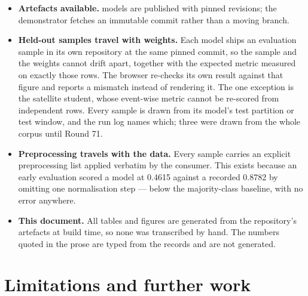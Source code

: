 \documentclass[11pt,a4paper]{article}
\begin{document}
\begin{itemize}
  \item \textbf{Artefacts available.} \npublished{} models are published with pinned revisions; the
        demonstrator fetches an immutable commit rather than a moving branch.
  \item \textbf{Held-out samples travel with weights.} Each model ships an evaluation sample in its
        own repository at the same pinned commit, so the sample and the weights cannot drift apart,
        together with the expected metric measured on exactly those rows. The browser re-checks its
        own result against that figure and reports a mismatch instead of rendering it. The one
        exception is the satellite student, whose event-wise metric cannot be re-scored from
        independent rows. Every sample is drawn from its model's test partition or test window, and
        the run log names which; three were drawn from the whole corpus until Round 71.
  \item \textbf{Preprocessing travels with the data.} Every sample carries an explicit preprocessing
        list applied verbatim by the consumer. This exists because an early evaluation scored a model
        at 0.4615 against a recorded 0.8782 by omitting one normalisation step --- below the
        majority-class baseline, with no error anywhere.
  \item \textbf{This document.} All tables and figures are generated from the repository's artefacts
        at build time, so none was transcribed by hand. The numbers quoted in the prose are typed
        from the records and are not generated.
\end{itemize}

\section{Limitations and further work}
\end{document}
